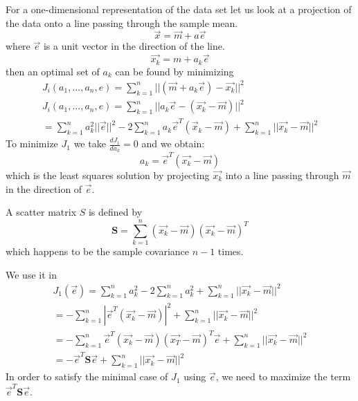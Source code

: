 \documentclass[11pt]{article}
\begin{document}
For a one-dimensional representation of the data set let us look at a projection of the data onto a line passing through the sample mean.  
\begin{equation}
	\vec{x} = \vec{m} + a \vec{e}
\end{equation}
where $\vec{e}$ is a unit vector in the direction of the line.  
\begin{equation}
\vec{x_k} = m + a_k \vec{e}
\end{equation}
then an optimal set of $a_k$ can be found by minimizing 
\begin{eqnarray}	
J_i (a_1, ..., a_n , e) = \sum _{k=1}^n  || (\vec{m} +a_k \vec{e}) - \vec{x_k}  ||^2 \\
J_i (a_1, ..., a_n , e) = \sum _{k=1}^n  || a_k \vec{e} - (\vec{x_k} - \vec{m}) ||^2 \\
= \sum_{k=1}^n a_k ^2 || \vec{e} || ^2 - 2 \sum _{k=1}^n a_k \vec{e}^T (\vec{x}_k - \vec{m}) + \sum_{k=1}^n || \vec{x_k} - \vec{m} || ^2 
\end{eqnarray}
To minimize $J_1$ we take $\frac{dJ_1}{d a_k} = 0$ and we obtain:
\begin{equation}
a_k = \vec{e}^T (\vec{x_k} - \vec{m})
\end{equation}
which is the least squares solution by projecting $\vec{x_k}$ into a line passing through $\vec{m}$ in the direction of $\vec{e}$. 

A scatter matrix $S$ is defined by 
\begin{equation}
	\mathbf{S} = \sum_{k=1}^n (\vec{x_k} -\vec{m})( \vec{x_k} - \vec{m})^T
\end{equation}
which happens to be the sample covariance $n-1$ times.  

We use it in 
\begin{eqnarray}
J_1 (\vec{e}) = \sum _{k=1}^n a_k ^2 - 2 \sum _{k=1} ^n a_k ^2 + \sum_{k=1}^n || \vec{x_k} - \vec{m} || ^2 \\
= - \sum _{k=1} ^ n | \vec{e}^T ( \vec{x_k} - \vec{m}) |^2  + \sum _{k=1} ^n || \vec{x_k} - \vec{m} || ^2 \\
= - \sum _{k=1} ^n \vec{e}^T ( \vec{x_k} - \vec{m})(\vec{x_T} - \vec{m})^T \vec{e} + \sum_{k=1} ^n || \vec{x_k} - \vec{m} ||^2 \\ 
= -\vec{e}^T \mathbf{S} \vec{e} + \sum_{k=1}^n || \vec{x_k} - \vec{m}||^2
\end{eqnarray}
In order to satisfy the minimal case of $J_1$ using $\vec{e}$, we need to maximize the term $\vec{e}^T \mathbf{S}\vec{e}$.  
\end{document}

